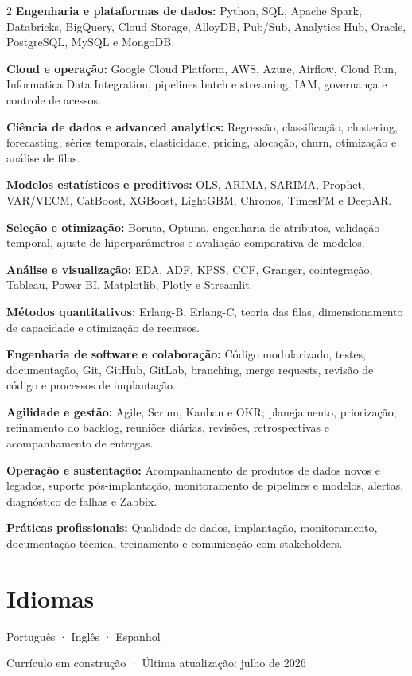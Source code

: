 \documentclass[10pt,a4paper]{article}
\newcommand{\skill}[2]{\textbf{#1:} #2\par}
\begin{document}
\begin{multicols}{2}
\raggedcolumns
\skill{Engenharia e plataformas de dados}{Python, SQL, Apache Spark, Databricks, BigQuery, Cloud Storage, AlloyDB, Pub/Sub, Analytics Hub, Oracle, PostgreSQL, MySQL e MongoDB.}
\skill{Cloud e operação}{Google Cloud Platform, AWS, Azure, Airflow, Cloud Run, Informatica Data Integration, pipelines batch e streaming, IAM, governança e controle de acessos.}
\skill{Ciência de dados e advanced analytics}{Regressão, classificação, clustering, forecasting, séries temporais, elasticidade, pricing, alocação, churn, otimização e análise de filas.}
\skill{Modelos estatísticos e preditivos}{OLS, ARIMA, SARIMA, Prophet, VAR/VECM, CatBoost, XGBoost, LightGBM, Chronos, TimesFM e DeepAR.}
\skill{Seleção e otimização}{Boruta, Optuna, engenharia de atributos, validação temporal, ajuste de hiperparâmetros e avaliação comparativa de modelos.}
\skill{Análise e visualização}{EDA, ADF, KPSS, CCF, Granger, cointegração, Tableau, Power BI, Matplotlib, Plotly e Streamlit.}
\skill{Métodos quantitativos}{Erlang-B, Erlang-C, teoria das filas, dimensionamento de capacidade e otimização de recursos.}
\skill{Engenharia de software e colaboração}{Código modularizado, testes, documentação, Git, GitHub, GitLab, branching, merge requests, revisão de código e processos de implantação.}
\skill{Agilidade e gestão}{Agile, Scrum, Kanban e OKR; planejamento, priorização, refinamento do backlog, reuniões diárias, revisões, retrospectivas e acompanhamento de entregas.}
\skill{Operação e sustentação}{Acompanhamento de produtos de dados novos e legados, suporte pós-implantação, monitoramento de pipelines e modelos, alertas, diagnóstico de falhas e Zabbix.}
\skill{Práticas profissionais}{Qualidade de dados, implantação, monitoramento, documentação técnica, treinamento e comunicação com stakeholders.}
\end{multicols}

\section{Idiomas}

Português · Inglês · Espanhol

\vfill
{\footnotesize\color{grey} Currículo em construção · Última atualização: julho de 2026}
\end{document}
